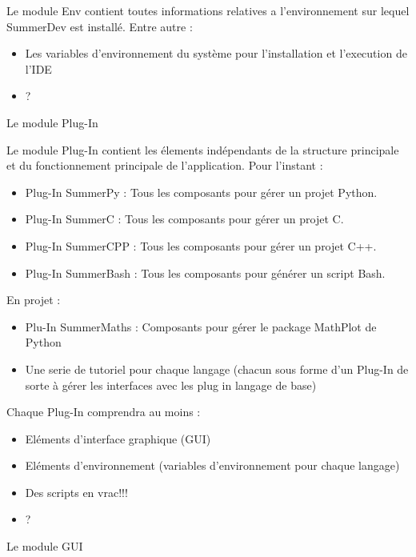 \documentclass[a4paper,12pt]{article}
\begin{document}
Le module Env contient toutes informations relatives a l'environnement sur lequel SummerDev est installé.
Entre autre :
\begin{itemize}
\item Les variables d'environnement du système pour l'installation et l'execution de l'IDE
\item ?
\end{itemize}


\begin{center}
{\LARGE Le module Plug-In}
\end{center}

Le module Plug-In contient les élements indépendants de la structure principale et du fonctionnement principale de l'application.
Pour l'instant :
\begin{itemize}
\item Plug-In SummerPy : Tous les composants pour gérer un projet Python.
\item Plug-In SummerC : Tous les composants pour gérer un projet C.
\item Plug-In SummerCPP : Tous les composants pour gérer un projet C++.
\item Plug-In SummerBash : Tous les composants pour générer un script Bash.
\end{itemize}

En projet :
\begin{itemize}
\item Plu-In SummerMaths : Composants pour gérer le package MathPlot de Python
\item Une serie de tutoriel pour chaque langage (chacun sous forme d'un Plug-In de sorte à gérer les interfaces avec les plug in langage de base)
\end{itemize}

Chaque Plug-In comprendra au moins :
\begin{itemize}
\item Eléments d'interface graphique (GUI)
\item Eléments d'environnement (variables d'environnement pour chaque langage)
\item Des scripts en vrac!!!
\item ?
\end{itemize}


\begin{center}
{\LARGE Le module GUI}
\end{center}
\end{document}
